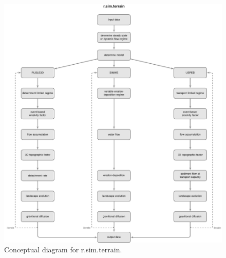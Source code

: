 \documentclass[gmd, manuscript]{copernicus}
\begin{document}

\begin{figure}%
\center
\includegraphics[width=\textwidth,keepaspectratio]{figures/concept.pdf}
\caption{Conceptual diagram for r.sim.terrain.}
\label{fig:evolution}
\end{figure}

\end{document}
